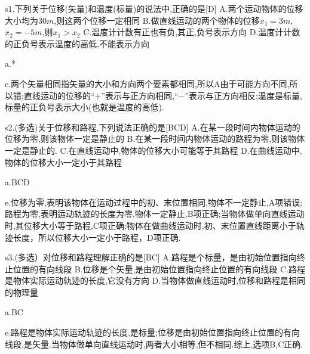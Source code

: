   \begin{selection}
    s1.下列关于位移(矢量)和温度(标量)的说法中,正确的是[D]
    A.两个运动物体的位移大小均为$30m$,则这两个位移一定相同
    B.做直线运动的两个物体的位移$x_1=3m$, $x_2=-5m$,则$x_1>x_2$
    C.温度计计数有正也有负,其正,负号表示方向
    D.温度计计数的正负号表示温度的高低,不能表示方向

    a.*

    e.两个矢量相同指矢量的大小和方向两个要素都相同,所以A由于可能方向不同,所以错;直线运动的位移的``$+$''表示与正方向相同,``$-$''表示与正方向相反;温度是标量,标量的正负号表示大小(也就是温度的高低).

    s2.(多选)关于位移和路程,下列说法正确的是[BCD]
    A.在某一段时间内物体运动的位移为零,则该物体一定是静止的
    B.在某一段时间内物体运动的路程为零,则该物体一定是静止的.
    C.在直线运动中,物体的位移大小可能等于其路程
    D.在曲线运动中,物体的位移大小一定小于其路程

    a.BCD

    e.位移为零,表明该物体在运动过程中的初、末位置相同,物体不一定静止,A项错误;路程为零,表明运动轨迹的长度为零,物体一定静止,B项正确;当物体做单向直线运动时,其位移大小等于路程,C项正确;物体在做曲线运动时,初、末位置直线距离小于轨迹长度，所以位移大小一定小于路程，D项正确.

    s3.(多选）对位移和路程理解正确的是[BC]
    A.路程是个标量，是由初始位置指向终止位置的有向线段
    B.位移是个矢量,是由初始位置指向终止位置的有向线段
    C.路程是物体实际运动轨迹的长度,它没有方向
    D.当物体做直线运动时,位移和路程是相同的物理量

    a.BC

    e.路程是物体实际运动轨迹的长度,是标量;位移是由初始位置指向终止位置的有向线段,是矢量.当物体做单向直线运动时,两者大小相等,但不相同.综上,选项B,C正确.

  \end{selection}
